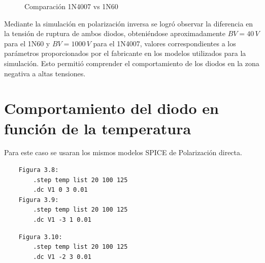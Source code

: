 \begin{figure}[H]
\centering
{}
\caption{Comparación 1N4007 vs 1N60}
\end{figure}

Mediante la simulación en polarización inversa se logró observar la diferencia en la tensión de ruptura de ambos diodos, obteniéndose aproximadamente \(BV=40\,V\) para el 1N60 y \(BV=1000\,V\) para el 1N4007, valores correspondientes a los 
parámetros proporcionados por el fabricante en los modelos utilizados para la simulación. Esto permitió comprender el comportamiento de los diodos en la zona negativa a altas tensiones.

\section{Comportamiento del diodo en función de la temperatura}
Para este caso se usaran los mismos modelos SPICE de Polarización directa.
\begin{tcolorbox}[
colback=gray!10,
colframe=black,
width=\textwidth,
boxrule=0.5pt,
arc=0pt
]
\begin{verbatim}
    Figura 3.8:
        .step temp list 20 100 125 
        .dc V1 0 3 0.01
    Figura 3.9:
        .step temp list 20 100 125 
        .dc V1 -3 1 0.01
\end{verbatim}

\end{tcolorbox}

\begin{tcolorbox}[
colback=gray!10,
colframe=black,
width=\textwidth,
boxrule=0.5pt,
arc=0pt
]
\begin{verbatim}
    Figura 3.10: 
        .step temp list 20 100 125
        .dc V1 -2 3 0.01 
\end{verbatim}

\end{tcolorbox}

